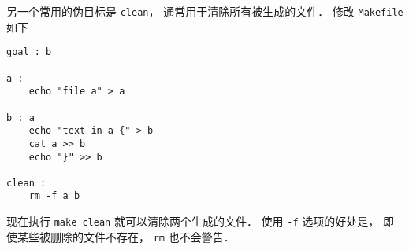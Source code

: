 另一个常用的伪目标是 \lstinline|clean|， 通常用于清除所有被生成的文件． 修改 \lstinline|Makefile| 如下
\begin{lstlisting}
goal : b

a :
	echo "file a" > a

b : a
	echo "text in a {" > b
	cat a >> b
	echo "}" >> b
    
clean :
	rm -f a b
\end{lstlisting}
现在执行 \lstinline|make clean| 就可以清除两个生成的文件． 使用 \lstinline|-f| 选项的好处是， 即使某些被删除的文件不存在， \lstinline|rm| 也不会警告．
